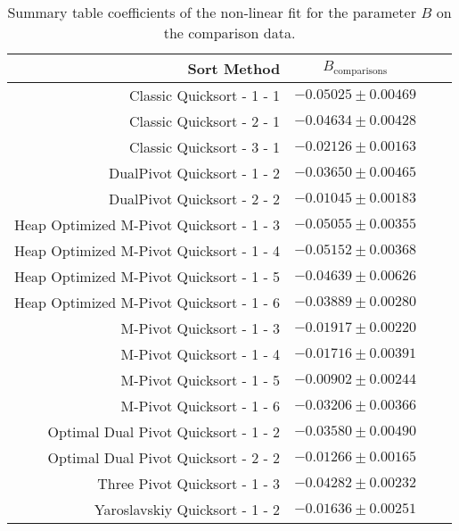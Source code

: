 		\begin{table}
			\begin{center}
				\begin{tabular}{|r|c|c|c}
					\hline
									Sort Method              &   $B_{\text{comparisons}}$      \\ \hline \hline
					                Classic Quicksort - 1 - 1 &   $-0.05025 \pm  0.00469$ \\ \hline
					                Classic Quicksort - 2 - 1 &   $-0.04634 \pm  0.00428$ \\ \hline
					                Classic Quicksort - 3 - 1 &   $-0.02126 \pm  0.00163$ \\ \hline
					              DualPivot Quicksort - 1 - 2 &   $-0.03650 \pm  0.00465$ \\ \hline
					              DualPivot Quicksort - 2 - 2 &   $-0.01045 \pm  0.00183$ \\ \hline
					 Heap Optimized M-Pivot Quicksort - 1 - 3 &   $-0.05055 \pm  0.00355$ \\ \hline
					 Heap Optimized M-Pivot Quicksort - 1 - 4 &   $-0.05152 \pm  0.00368$ \\ \hline
					 Heap Optimized M-Pivot Quicksort - 1 - 5 &   $-0.04639 \pm  0.00626$ \\ \hline
					 Heap Optimized M-Pivot Quicksort - 1 - 6 &   $-0.03889 \pm  0.00280$ \\ \hline
					                M-Pivot Quicksort - 1 - 3 &   $-0.01917 \pm  0.00220$ \\ \hline
					                M-Pivot Quicksort - 1 - 4 &   $-0.01716 \pm  0.00391$ \\ \hline
					                M-Pivot Quicksort - 1 - 5 &   $-0.00902 \pm  0.00244$ \\ \hline
					                M-Pivot Quicksort - 1 - 6 &   $-0.03206 \pm  0.00366$ \\ \hline
					     Optimal Dual Pivot Quicksort - 1 - 2 &   $-0.03580 \pm  0.00490$ \\ \hline
					     Optimal Dual Pivot Quicksort - 2 - 2 &   $-0.01266 \pm  0.00165$ \\ \hline
					            Three Pivot Quicksort - 1 - 3 &   $-0.04282 \pm  0.00232$ \\ \hline
					           Yaroslavskiy Quicksort - 1 - 2 &   $-0.01636 \pm  0.00251$ \\ \hline
				\end{tabular}
				\caption{Summary table coefficients of the non-linear fit for the parameter $B$ on the comparison data.}
				\label{tab:compFitCoeffB}
			\end{center}
		\end{table}


